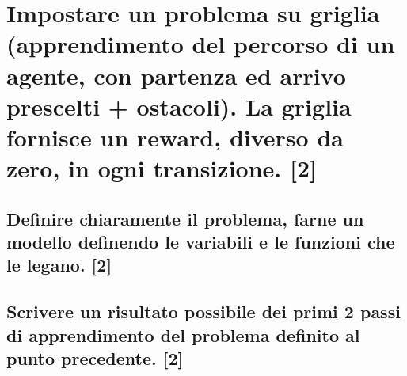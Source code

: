 \documentclass[\main/main.tex]{subfiles}
\begin{document}
\section{Impostare un problema su griglia (apprendimento del percorso di un agente, con partenza ed arrivo prescelti + ostacoli). La griglia fornisce un reward, diverso da zero, in ogni transizione. [2]}
\subsection{Definire chiaramente il problema, farne un modello definendo le variabili e le funzioni che le legano. [2]}
\subsection{Scrivere un risultato possibile dei primi 2 passi di apprendimento del problema definito al punto precedente. [2]} 
\end{document}
